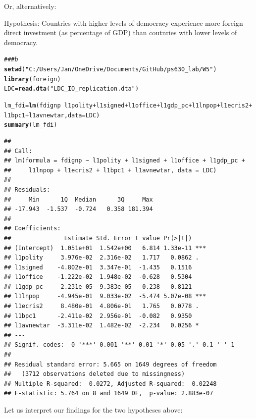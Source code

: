 \documentclass[12pt,letter]{article}\usepackage[]{graphicx}\usepackage[]{color}
\makeatletter
\newcommand{\hlstr}[1]{\textcolor[rgb]{0.192,0.494,0.8}{#1}}%
\newcommand{\hlcom}[1]{\textcolor[rgb]{0.678,0.584,0.686}{\textit{#1}}}%
\newcommand{\hlopt}[1]{\textcolor[rgb]{0,0,0}{#1}}%
\newcommand{\hlstd}[1]{\textcolor[rgb]{0.345,0.345,0.345}{#1}}%
\newcommand{\hlkwb}[1]{\textcolor[rgb]{0.69,0.353,0.396}{#1}}%
\newcommand{\hlkwc}[1]{\textcolor[rgb]{0.333,0.667,0.333}{#1}}%
\newcommand{\hlkwd}[1]{\textcolor[rgb]{0.737,0.353,0.396}{\textbf{#1}}}%
\newenvironment{kframe}{%
 \def\at@end@of@kframe{}%
 \ifinner\ifhmode%
  \def\at@end@of@kframe{\end{minipage}}%
  \begin{minipage}{\columnwidth}%
 \fi\fi%
 \def\FrameCommand##1{\hskip\@totalleftmargin \hskip-\fboxsep
 \colorbox{shadecolor}{##1}\hskip-\fboxsep
     \hskip-\linewidth \hskip-\@totalleftmargin \hskip\columnwidth}%
 \MakeFramed {\advance\hsize-\width
   \@totalleftmargin\z@ \linewidth\hsize
   \@setminipage}}%
 {\par\unskip\endMakeFramed%
 \at@end@of@kframe}
\newenvironment{knitrout}{}{} %
\makeatother
\begin{document}
Or, alternatively:

Hypothesis: Countries with higher levels of democracy experience more foreign direct investment (as percentage of GDP) than coutnries with lower levels of democracy.

\begin{knitrout}
\color{fgcolor}\begin{kframe}
\begin{alltt}
\hlcom{### b}
\hlkwd{setwd}\hlstd{(}\hlstr{"C:/Users/Jan/OneDrive/Documents/GitHub/ps630_lab/W5"}\hlstd{)}
\hlkwd{library}\hlstd{(foreign)}
\hlstd{LDC} \hlkwb{=} \hlkwd{read.dta}\hlstd{(}\hlstr{"LDC_IO_replication.dta"}\hlstd{)}

\hlstd{lm_fdi} \hlkwb{=} \hlkwd{lm}\hlstd{(fdignp} \hlopt{~} \hlstd{l1polity} \hlopt{+} \hlstd{l1signed} \hlopt{+} \hlstd{l1office} \hlopt{+} \hlstd{l1gdp_pc} \hlopt{+} \hlstd{l1lnpop} \hlopt{+} \hlstd{l1ecris2} \hlopt{+}
    \hlstd{l1bpc1} \hlopt{+} \hlstd{l1avnewtar,} \hlkwc{data} \hlstd{= LDC)}
\hlkwd{summary}\hlstd{(lm_fdi)}
\end{alltt}
\begin{verbatim}
## 
## Call:
## lm(formula = fdignp ~ l1polity + l1signed + l1office + l1gdp_pc + 
##     l1lnpop + l1ecris2 + l1bpc1 + l1avnewtar, data = LDC)
## 
## Residuals:
##     Min      1Q  Median      3Q     Max 
## -17.943  -1.537  -0.724   0.358 181.394 
## 
## Coefficients:
##               Estimate Std. Error t value Pr(>|t|)    
## (Intercept)  1.051e+01  1.542e+00   6.814 1.33e-11 ***
## l1polity     3.976e-02  2.316e-02   1.717   0.0862 .  
## l1signed    -4.802e-01  3.347e-01  -1.435   0.1516    
## l1office    -1.222e-02  1.948e-02  -0.628   0.5304    
## l1gdp_pc    -2.231e-05  9.383e-05  -0.238   0.8121    
## l1lnpop     -4.945e-01  9.033e-02  -5.474 5.07e-08 ***
## l1ecris2     8.480e-01  4.806e-01   1.765   0.0778 .  
## l1bpc1      -2.411e-02  2.956e-01  -0.082   0.9350    
## l1avnewtar  -3.311e-02  1.482e-02  -2.234   0.0256 *  
## ---
## Signif. codes:  0 '***' 0.001 '**' 0.01 '*' 0.05 '.' 0.1 ' ' 1
## 
## Residual standard error: 5.665 on 1649 degrees of freedom
##   (3712 observations deleted due to missingness)
## Multiple R-squared:  0.0272,	Adjusted R-squared:  0.02248 
## F-statistic: 5.764 on 8 and 1649 DF,  p-value: 2.883e-07
\end{verbatim}
\end{kframe}
\end{knitrout}

Let us interpret our findings for the two hypotheses above:
\end{document}
